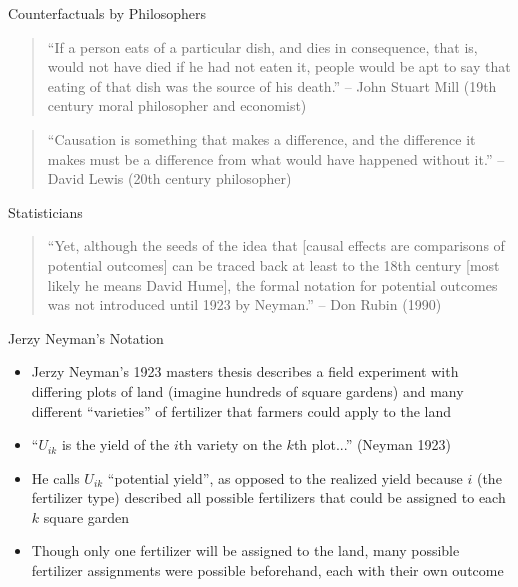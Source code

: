 \documentclass{beamer}
\begin{document}
\begin{frame}{Counterfactuals by Philosophers}

\begin{quote}
    ``If a person eats of a particular dish, and dies in consequence, that is, would not have died if he had not eaten it, people would be apt to say that eating of that dish was the source of his death.'' -- John Stuart Mill (19th century moral philosopher and economist)
\end{quote}

\bigskip
  
    \begin{quote}
    ``Causation is something that makes a difference, and the difference it makes must be a difference from what would have happened without it.'' -- David Lewis (20th century philosopher)
\end{quote}

\end{frame}

  


\begin{frame}{Statisticians}

\begin{quote}
``Yet, although the seeds of the idea that [causal effects are comparisons of potential outcomes] can be traced back at least to the 18th century [most likely he means David Hume], the formal notation for potential outcomes was not introduced until 1923 by Neyman.'' -- Don Rubin (1990)
\end{quote}

\end{frame}


\begin{frame}{Jerzy Neyman's Notation}

\begin{itemize}
\item Jerzy Neyman's 1923 masters thesis describes a field experiment with differing plots of land (imagine hundreds of square gardens) and many different ``varieties'' of fertilizer that farmers could apply to the land
\item ``$U_{ik}$ is the yield of the $i$th variety on the $k$th plot...'' (Neyman 1923)
\item He calls $U_{ik}$ ``potential yield'', as opposed to the realized yield because $i$ (the fertilizer type) described all possible fertilizers that could be assigned to each $k$ square garden
\item Though only one fertilizer will be assigned to the land, many possible fertilizer assignments were possible beforehand, each with their own outcome
\end{itemize}

\end{frame}
\end{document}
